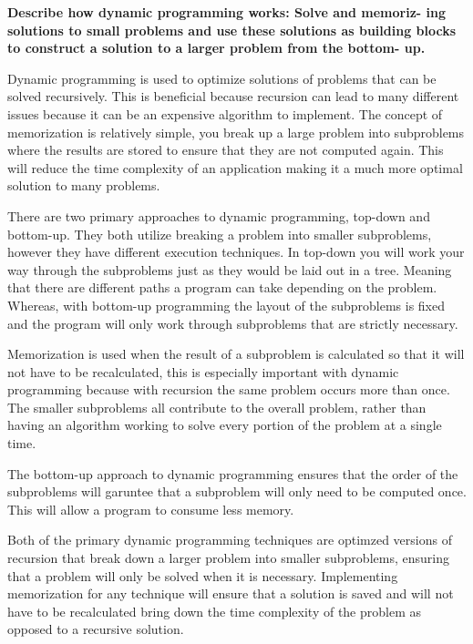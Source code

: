 \documentclass{article}
\begin{document}
\bigskip

\noindent \textbf{Describe how dynamic programming works: Solve and memoriz-
ing solutions to small problems and use these solutions as building
blocks to construct a solution to a larger problem from the bottom-
up.}

\medskip

Dynamic programming is used to optimize solutions of problems that can be solved recursively.
This is beneficial because recursion can lead to many different issues because it can be an 
expensive algorithm to implement. The concept of memorization is relatively simple, you break up a large problem
into subproblems where the results are stored to ensure that they are not computed again.
This will reduce the time complexity of an application making it a much more optimal solution
to many problems.

There are two primary approaches to dynamic programming, top-down and bottom-up. They both utilize
breaking a problem into smaller subproblems, however they have different execution techniques.
In top-down you will work your way through the subproblems just as they would be laid out in a tree.
Meaning that there are different paths a program can take depending on the problem. Whereas, with
bottom-up programming the layout of the subproblems is fixed and the program will only work through
subproblems that are strictly necessary.

Memorization is used when the result of a subproblem is calculated so that it will not have
to be recalculated, this is especially important with dynamic programming because with recursion
the same problem occurs more than once. The smaller subproblems all contribute to the overall 
problem, rather than having an algorithm working to solve every portion of the problem at a 
single time.

The bottom-up approach to dynamic programming ensures that the order of the subproblems will
garuntee that a subproblem will only need to be computed once. This will allow a program to
consume less memory. 

Both of the primary dynamic programming techniques are optimzed versions of recursion that
break down a larger problem into smaller subproblems, ensuring that a problem will only be solved
when it is necessary. Implementing memorization for any technique will ensure that a solution is
saved and will not have to be recalculated bring down the time complexity of the problem as
opposed to a recursive solution.
\end{document}
